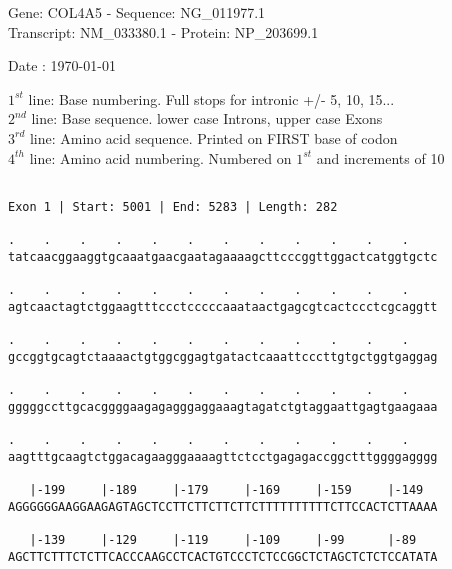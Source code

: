 \documentclass{article}
\begin{document}
\begin{center}
\begin{large}
Gene: COL4A5 - Sequence: NG\_011977.1\\
Transcript: NM\_033380.1 - Protein: NP\_203699.1
 
 Date : \today
\end{large}
\end{center}
$1^{st}$ line: Base numbering. Full stops for intronic +/- 5, 10, 15...\\
$2^{nd}$ line: Base sequence. lower case Introns, upper case Exons\\
$3^{rd}$ line: Amino acid sequence. Printed on FIRST base of codon\\
$4^{th}$ line: Amino acid numbering. Numbered on $1^{st}$ and increments of 10\\
 \begin{Verbatim}
 
Exon 1 | Start: 5001 | End: 5283 | Length: 282
 
.    .    .    .    .    .    .    .    .    .    .    .    
tatcaacggaaggtgcaaatgaacgaatagaaaagcttcccggttggactcatggtgctc
                                                            
.    .    .    .    .    .    .    .    .    .    .    .    
agtcaactagtctggaagtttccctcccccaaataactgagcgtcactccctcgcaggtt
                                                            
.    .    .    .    .    .    .    .    .    .    .    .    
gccggtgcagtctaaaactgtggcggagtgatactcaaattcccttgtgctggtgaggag
                                                            
.    .    .    .    .    .    .    .    .    .    .    .    
gggggccttgcacggggaagagagggaggaaagtagatctgtaggaattgagtgaagaaa
                                                            
.    .    .    .    .    .    .    .    .    .    .    .    
aagtttgcaagtctggacagaagggaaaagttctcctgagagaccggctttggggagggg
                                                            
   |-199     |-189     |-179     |-169     |-159     |-149  
AGGGGGGAAGGAAGAGTAGCTCCTTCTTCTTCTTCTTTTTTTTTTCTTCCACTCTTAAAA
                                                            
   |-139     |-129     |-119     |-109     |-99      |-89   
AGCTTCTTTCTCTTCACCCAAGCCTCACTGTCCCTCTCCGGCTCTAGCTCTCTCCATATA
                                                            

\end{Verbatim}
\end{document}
